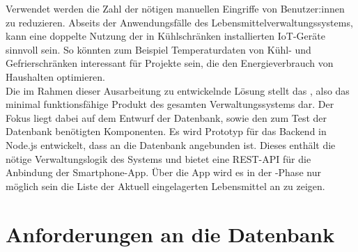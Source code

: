 Verwendet werden die Zahl der nötigen manuellen Eingriffe von Benutzer:innen zu reduzieren. Abseits der Anwendungsfälle des Lebensmittelverwaltungssystems, kann eine doppelte Nutzung der in Kühlschränken installierten IoT-Geräte sinnvoll sein. So könnten zum Beispiel Temperaturdaten von Kühl- und Gefrierschränken interessant für Projekte sein, die den Energieverbrauch von Haushalten optimieren.\\ Die im Rahmen dieser Ausarbeitung zu entwickelnde Lösung stellt das , also das minimal funktionsfähige Produkt des gesamten Verwaltungssystems dar. Der Fokus liegt dabei auf dem Entwurf der Datenbank, sowie den zum Test der Datenbank benötigten Komponenten. Es wird Prototyp für das \gls{Backend} in Node.js entwickelt, dass an die Datenbank angebunden ist. Dieses enthält die nötige Verwaltungslogik des Systems und bietet eine \gls{REST-API} für die Anbindung der Smartphone-App. Über die App wird es in der -Phase nur möglich sein die Liste der Aktuell eingelagerten Lebensmittel an zu zeigen.

\section{Anforderungen an die Datenbank}\label{sec:Anforderungen an die Datenbank}

